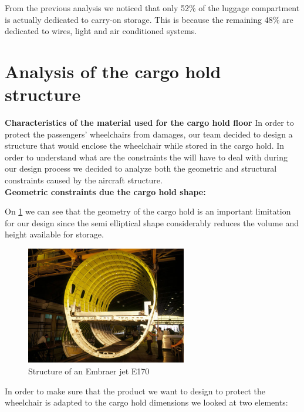From the previous analysis we noticed that only 52\% of the luggage compartment is actually dedicated to carry-on storage. This is because the remaining 48\% are dedicated to wires, light and air conditioned systems.

\section{Analysis of the cargo hold structure}

\textbf{Characteristics of the material used for the cargo hold floor}
In order to protect the passengers’ wheelchairs from damages, our team decided to design a structure that would enclose the wheelchair while stored in the cargo hold. In order to understand what are the constraints the will have to deal with during our design process we decided to analyze both the geometric and structural constraints caused by the aircraft structure.
\\
\textbf{Geometric constraints due the cargo hold shape:}

On \ref{fig:aircraft_structure} we can see that the geometry of the cargo hold is an important limitation for our design since the semi elliptical shape considerably reduces the volume and height available for storage.

\begin{figure}[h]
\centering
\includegraphics[width=7cm]{images/aircraft_structure.png}
\caption{Structure of an Embraer jet E170 \cite{embraer_struct}}
\label{fig:aircraft_structure}
\end{figure}

In order to make sure that the product we want to design to protect the wheelchair is adapted to the cargo hold dimensions we looked at two elements:

